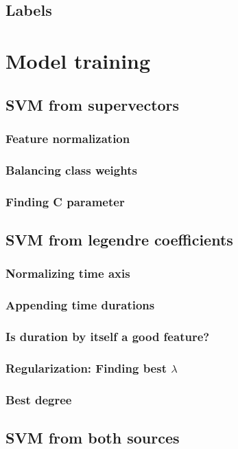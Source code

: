 \documentclass[11pt,a4paper]{tesis}
\begin{document}
		\subsection{Labels}
	\section{Model training}
		\subsection{SVM from supervectors}
			\subsubsection{Feature normalization}
			\subsubsection{Balancing class weights}
			\subsubsection{Finding C parameter}
		\subsection{SVM from legendre coefficients}
			\subsubsection{Normalizing time axis}
			\subsubsection{Appending time durations}
			\subsubsection{Is duration by itself a good feature?}
			\subsubsection{Regularization: Finding best $\lambda$}
			\subsubsection{Best degree}
		\subsection{SVM from both sources}
\end{document}
